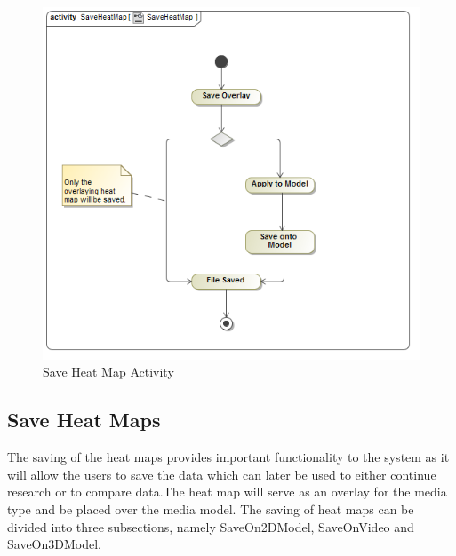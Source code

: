 	\begin{figure}[!ht]
		\centering
		\includegraphics[scale=0.5]{Diagrams/Activity_Diagram__SaveHeatMap__SaveHeatMap.png}
		\caption{Save Heat Map Activity}
	\end{figure}
	
\subsection{Save Heat Maps}
	The saving of the heat maps provides important functionality to the system as it will allow the users to save the data which can later be used to either continue research or to compare data.The heat map will serve as an overlay for the media type and be placed over the media model. The saving of heat maps can be divided into three subsections, namely SaveOn2DModel, SaveOnVideo and SaveOn3DModel.
	\newline
	
